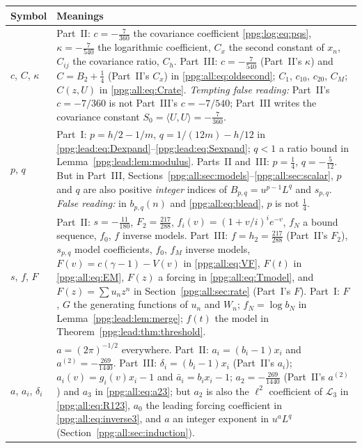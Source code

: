 \documentclass[11pt,letterpaper]{article}
\theoremstyle{remark}\newtheorem{remark}[theorem]{Remark}
\numberwithin{equation}{section}
\newcommand{\ip}[2]{\langle #1,#2\rangle}
\begin{document}
\begin{longtable}{@{}>{\raggedright\arraybackslash}p{} >{\raggedright\arraybackslash}p{}@{}}
\toprule
Symbol & Meanings\\
\midrule
\endhead
$c$, $C$, $\kappa$ & Part~II: $c=-\frac7{360}$ the covariance coefficient \eqref{ppg:log:eq:pqs}, $\kappa=-\frac7{540}$ the logarithmic coefficient, $C_x$ the second constant of $x_n$, $C_{ij}$ the covariance ratio, $C_h$. Part~III: $c=-\frac7{540}$ (Part~II's $\kappa$) and $C=B_2+\frac14$ (Part~II's $C_x$) in \eqref{ppg:all:eq:oldsecond}; $C_1$, $c_{10}$, $c_{20}$, $C_M$; $C(z,U)$ in \eqref{ppg:all:eq:Crate}. \emph{Tempting false reading:} Part~II's $c=-7/360$ is not Part~III's $c=-7/540$; Part~III writes the covariance constant $S_0=\ip UU=-\frac7{360}$.\\
$p$, $q$ & Part~I: $p=h/2-1/m$, $q=1/(12m)-h/12$ in \eqref{ppg:lead:eq:Dexpand}--\eqref{ppg:lead:eq:Sexpand}; $q<1$ a ratio bound in Lemma~\ref{ppg:lead:lem:modulus}. Parts~II and~III: $p=\frac14$, $q=-\frac5{12}$. But in Part~III, Sections~\ref{ppg:all:sec:models}--\ref{ppg:all:sec:scalar}, $p$ and $q$ are also positive \emph{integer} indices of $B_{p,q}=u^{p-1}L^q$ and $s_{p,q}$. \emph{False reading:} in $b_{p,q}(n)$ and \eqref{ppg:all:eq:blead}, $p$ is not $\frac14$.\\
$s$, $f$, $F$ & Part~II: $s=-\frac{11}{180}$, $F_2=\frac{217}{288}$, $f_i(v)=(1+v/i)^ie^{-v}$, $f_N$ a bound sequence, $f_0$, $f$ inverse models. Part~III: $f=h_2=\frac{217}{288}$ (Part~II's $F_2$), $s_{p,q}$ model coefficients, $f_0$, $f_M$ inverse models, $F(v)=c(\gamma-1)-V(v)$ in \eqref{ppg:all:eq:VF}, $F(t)$ in \eqref{ppg:all:eq:EM}, $F(z)$ a forcing in \eqref{ppg:all:eq:Tmodel}, and $F(z)=\sum u_nz^n$ in Section~\ref{ppg:all:sec:rate} (Part~I's $F$). Part~I: $F$, $G$ the generating functions of $u_n$ and $W_n$; $f_N=\log b_N$ in Lemma~\ref{ppg:lead:lem:merge}; $f(t)$ the model in Theorem~\ref{ppg:lead:thm:threshold}.\\
$a$, $a_i$, $\delta_i$ & $a=(2\pi)^{-1/2}$ everywhere. Part~II: $a_i=(b_i-1)x_i$ and $a^{(2)}=-\frac{269}{1440}$. Part~III: $\delta_i=(b_i-1)x_i$ (Part~II's $a_i$); $a_i(v)=g_i(v)x_i-1$ and $\bar a_i=b_ix_i-1$; $a_2=-\frac{269}{1440}$ (Part~II's $a^{(2)}$) and $a_3$ in \eqref{ppg:all:eq:a23}; but $a_2$ is also the $\ell^2$ coefficient of $\mathcal L_3$ in \eqref{ppg:all:eq:R123}, $a_0$ the leading forcing coefficient in \eqref{ppg:all:eq:inverse3}, and $a$ an integer exponent in $u^aL^q$ (Section~\ref{ppg:all:sec:induction}).\\

\end{longtable}
\end{document}
